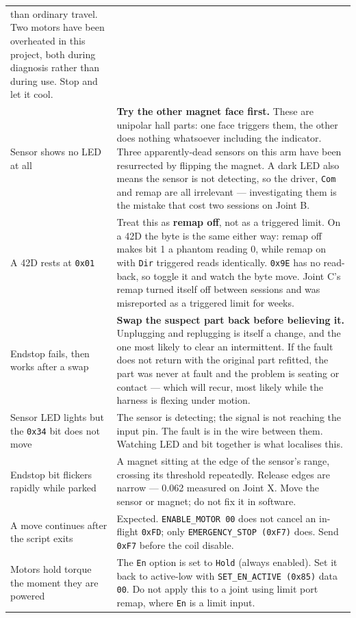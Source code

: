 \documentclass[11pt,letterpaper]{article}
\begin{document}
\begin{longtable}{p{}p{}}
  than ordinary travel. Two motors have been overheated in this project, both
  during diagnosis rather than during use. Stop and let it cool. \\
Sensor shows no LED at all &
  \textbf{Try the other magnet face first.} These are unipolar hall parts: one
  face triggers them, the other does nothing whatsoever including the indicator.
  Three apparently-dead sensors on this arm have been resurrected by flipping
  the magnet. A dark LED also means the sensor is not detecting, so the driver,
  \texttt{Com} and remap are all irrelevant --- investigating them is the
  mistake that cost two sessions on Joint B. \\
A 42D rests at \texttt{0x01} &
  Treat this as \textbf{remap off}, not as a triggered limit. On a 42D the byte
  is the same either way: remap off makes bit 1 a phantom reading 0, while remap
  on with \texttt{Dir} triggered reads identically. \texttt{0x9E} has no
  read-back, so toggle it and watch the byte move. Joint C's remap turned itself
  off between sessions and was misreported as a triggered limit for weeks. \\
Endstop fails, then works after a swap &
  \textbf{Swap the suspect part back before believing it.} Unplugging and
  replugging is itself a change, and the one most likely to clear an
  intermittent. If the fault does not return with the original part refitted,
  the part was never at fault and the problem is seating or contact --- which
  will recur, most likely while the harness is flexing under motion. \\
Sensor LED lights but the \texttt{0x34} bit does not move &
  The sensor is detecting; the signal is not reaching the input pin. The fault is
  in the wire between them. Watching LED and bit together is what localises this. \\
Endstop bit flickers rapidly while parked &
  A magnet sitting at the edge of the sensor's range, crossing its threshold
  repeatedly. Release edges are narrow --- 0.062\textdegree{} measured on Joint X.
  Move the sensor or magnet; do not fix it in software. \\
A move continues after the script exits &
  Expected. \texttt{ENABLE\_MOTOR 00} does not cancel an in-flight \texttt{0xFD};
  only \texttt{EMERGENCY\_STOP (0xF7)} does. Send \texttt{0xF7} before the coil
  disable. \\
Motors hold torque the moment they are powered &
  The \texttt{En} option is set to \texttt{Hold} (always enabled). Set it back to
  active-low with \texttt{SET\_EN\_ACTIVE (0x85)} data \texttt{00}. Do not apply
  this to a joint using limit port remap, where \texttt{En} is a limit input. \\
\bottomrule
\end{longtable}
\end{document}

